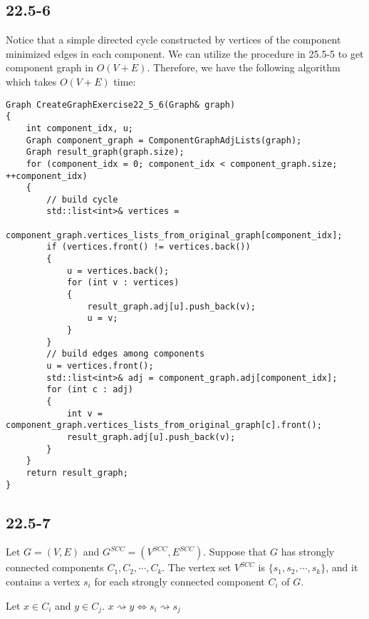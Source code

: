 \subsection*{22.5-6}

Notice that a simple directed cycle constructed by vertices of the component
minimized edges in each component.
We can utilize the procedure in 25.5-5 to get component graph in $O(V + E)$.
Therefore, we have the following algorithm which takes $O(V + E)$ time:

\begin{verbatim}
Graph CreateGraphExercise22_5_6(Graph& graph)
{
    int component_idx, u;
    Graph component_graph = ComponentGraphAdjLists(graph);
    Graph result_graph(graph.size);
    for (component_idx = 0; component_idx < component_graph.size; ++component_idx)
    {
        // build cycle
        std::list<int>& vertices = 
            component_graph.vertices_lists_from_original_graph[component_idx];
        if (vertices.front() != vertices.back())
        {
            u = vertices.back();
            for (int v : vertices)
            {
                result_graph.adj[u].push_back(v);
                u = v;
            }
        }
        // build edges among components
        u = vertices.front();
        std::list<int>& adj = component_graph.adj[component_idx];
        for (int c : adj)
        {
            int v = component_graph.vertices_lists_from_original_graph[c].front();
            result_graph.adj[u].push_back(v);
        }
    }
    return result_graph;
}
\end{verbatim}

\subsection*{22.5-7}

Let $G = (V,E)$ and $G^{SCC} = (V^{SCC},E^{SCC})$.
Suppose that $G$ has strongly connected components $C_1,C_2,\cdots,C_k$.
The vertex set $V^{SCC}$ is $\{ s_1, s_2, \cdots, s_k \}$,
and it contains a vertex $s_i$ for each strongly connected component $C_i$ of $G$.

\begin{lemma}
    Let $x \in C_i$ and $y \in C_j$.
    $x \rightsquigarrow y \Longleftrightarrow s_i \rightsquigarrow s_j$ 
\end{lemma}

